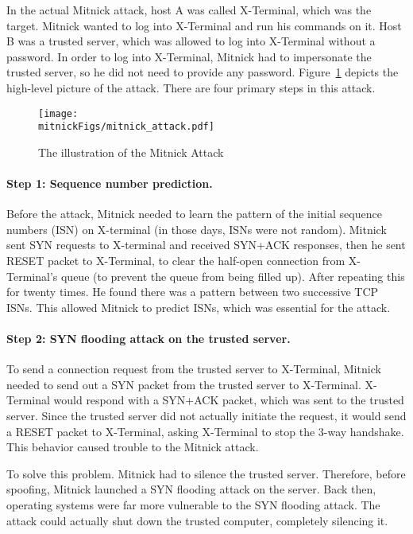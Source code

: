 In the actual Mitnick attack, host A was called X-Terminal, 
which was the target. Mitnick
wanted to log into X-Terminal and run his commands on it. 
Host B was a trusted server, which was allowed to log into X-Terminal without a password.  
In order to log into X-Terminal, Mitnick had to impersonate the trusted server, so
he did not need to provide any password. Figure~\ref{tcp:mitnick} depicts
the high-level picture of the attack. 
There are four primary steps in this attack.


\begin{figure}[htb]
\centering
\texttt{[image: \\mitnickFigs/mitnick\_attack.pdf]}
\caption{The illustration of the Mitnick Attack}
\label{tcp:mitnick}
\end{figure}


\paragraph{Step 1: Sequence number prediction.} 
Before the attack, Mitnick needed to learn the pattern of the initial sequence numbers (ISN)
on X-terminal (in those days, ISNs were not random). 
Mitnick sent SYN requests to X-terminal and received SYN+ACK responses, 
then he sent
RESET packet to X-Terminal, to clear the half-open connection
from X-Terminal's queue (to prevent the queue from being filled up). After repeating
this for twenty times. He found there was a pattern between two successive
TCP ISNs. This allowed Mitnick to predict ISNs, which was essential for
the attack. 


\paragraph{Step 2: SYN flooding attack on the trusted server.} To
send a connection request from the trusted server to X-Terminal,
Mitnick needed to send out a SYN packet from
the trusted server to X-Terminal. X-Terminal would respond with a
SYN+ACK packet, which was sent to the trusted server. Since the trusted server
did not actually initiate the request, it would send a RESET packet 
to X-Terminal, asking X-Terminal to stop the 3-way handshake. This behavior
caused trouble to the Mitnick attack.

To solve this problem. Mitnick had to silence the trusted server. 
Therefore, before spoofing, Mitnick launched a SYN
flooding attack on the server. Back then, operating systems were far more
vulnerable to the SYN flooding attack.  The attack could actually shut down the
trusted computer, completely silencing it. 


